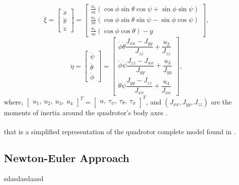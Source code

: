 \begin{equation}
\label{eqn:E-L1}
\ddot{\xi} =
\begin{bmatrix}
\ddot{x} \\ \ddot{y} \\ \ddot{z}
\end{bmatrix} 
=
\begin{bmatrix}
\frac{u_{1}}{m}(\cos\phi\sin\theta\cos\psi + \sin\phi\sin\psi) \\
 \frac{u_{1}}{m}(\cos\phi\sin\theta\sin\psi - \sin\phi\cos\psi) \\
\frac{u_{1}}{m}(\cos\phi\cos\theta) - g
\end{bmatrix},
\end{equation}
\begin{equation}
\label{eqn:E-L2}
\ddot{\eta} =
\begin{bmatrix}
\ddot{\psi} \\ \ddot{\theta} \\ \ddot{\phi}
\end{bmatrix} 
 =
\begin{bmatrix}
\dot{\phi}\dot{\theta}\dfrac{J_{xx}-J_{yy}}{J_{zz}} + \dfrac{u_{2}}{J_{zz}} \\
\dot{\phi}\dot{\psi}\dfrac{J_{zz}-J_{xx}}{J_{yy}} + \dfrac{u_{3}}{J_{yy}} \\
 \dot{\theta}\dot{\psi}\dfrac{J_{yy}-J_{zz}}{J_{xx}} +  \dfrac{u_{4}}{J_{xx}}
\end{bmatrix},
\end{equation}
where, $\begin{bmatrix}
u_{1},\ u_{2},\ u_{3}, \ u_{4}
\end{bmatrix}^{T} = \begin{bmatrix}
u,\ \tau_{\psi},\ \tau_{\theta},\ \tau_{\phi}
\end{bmatrix}^{T} $, and $ (J_{xx}, J_{yy}, J_{zz}) $ are the moments of inertia around the quadrotor's body axes \cite{Emam2016, Badr2016}.
\\\\

that is a simplified representation of the quadrotor complete model found in \cite{Bouabdallah2007}.

\subsection{Newton-Euler Approach}
sdasdasdaasd

